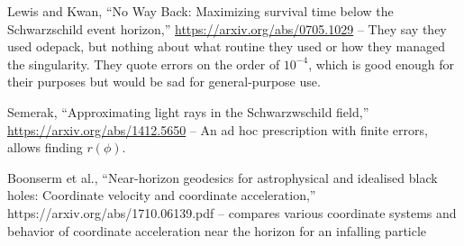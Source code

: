 \documentclass{article}
\begin{document}
Lewis and Kwan, ``No Way Back: Maximizing survival time below the Schwarzschild event horizon,''
\url{https://arxiv.org/abs/0705.1029} -- They say they used odepack, but nothing about what
routine they used or how they managed the singularity. They quote errors on the order of
$10^{-4}$, which is good enough for their purposes but would be sad for general-purpose use.

Semerak, ``Approximating light rays in the Schwarzwschild field,''
\url{https://arxiv.org/abs/1412.5650} -- An ad hoc prescription with finite errors,
allows finding $r(\phi)$.

Boonserm et al., ``Near-horizon geodesics for astrophysical and idealised
black holes: Coordinate velocity and coordinate acceleration,''
https://arxiv.org/abs/1710.06139.pdf -- compares various coordinate systems
and behavior of coordinate acceleration near the horizon for an infalling particle
\end{document}
